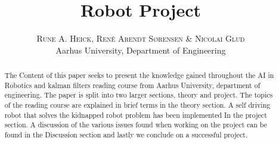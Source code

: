 


\title{\vspace{-15mm}\fontsize{24pt}{10pt}\selectfont\textbf{Robot Project}} %

\author{
\large
\textsc{Rune A. Heick, René Arendt Sørensen \& Nicolai Glud}\\[2mm] %
\normalsize Aarhus University, Department of Engineering \\ %
\vspace{-5mm}
}
\date{}



\setlength{\abovedisplayskip}{1cm}
\setlength{\belowdisplayskip}{.8cm}
\maketitle %

\newpage

\begin{abstract}
The Content of this paper seeks to present the knowledge gained throughout the AI in Robotics and kalman filters reading course from Aarhus University, department of engineering. The paper is split into two larger sections,  theory and project. The topics of the reading course are explained in brief terms in the theory section.  A self driving robot that solves the kidnapped robot problem has been implemented In the project section. A discussion of the various issues found when working on the project can be found in the Discussion section and lastly we conclude on a successful project.
\end{abstract}
\tableofcontents



